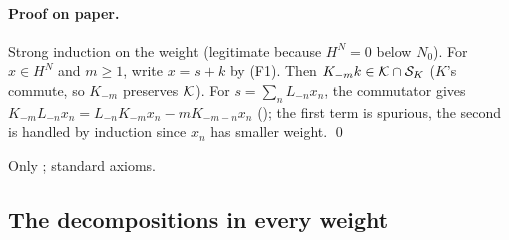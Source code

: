 \paragraph{Proof on paper.}  Strong induction on the weight (legitimate because $H^N=0$ below $N_0$).  For
$x\in H^N$ and $m\ge1$, write $x=s+k$ by (F1).  Then $K_{-m}k\in\mathcal{K}\cap\mathcal{S}_K$ ($K$'s commute, so $K_{-m}$ preserves
$\mathcal{K}$).  For $s=\sum_nL_{-n}x_n$, the commutator gives $K_{-m}L_{-n}x_n=L_{-n}K_{-m}x_n-mK_{-m-n}x_n$
(); the first term is spurious, the second is handled by induction since $x_n$
has smaller weight. \qed
\begin{status}Only ; standard axioms.\end{status}

\subsection{The decompositions in every weight}

